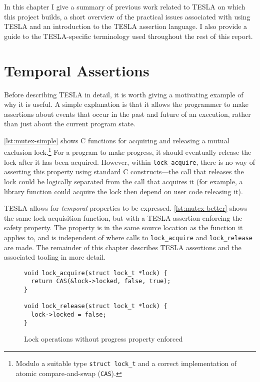 In this chapter I give a summary of previous work related to TESLA on which this
project builds, a short overview of the practical issues associated with using
TESLA and an introduction to the TESLA assertion language. I also provide a
guide to the TESLA-specific terminology used throughout the rest of this report.

\section{Temporal Assertions}

Before describing TESLA in detail, it is worth giving a motivating
example of why it is useful. A simple explanation is that it allows the
programmer to make assertions about events that occur in the past and
future of an execution, rather than just about the current program
state.

\autoref{lst:mutex-simple} shows C functions for acquiring and releasing
a mutual exclusion lock.\footnote{Modulo a suitable type
\texttt{struct lock_t} and a correct implementation of atomic
compare-and-swap (\texttt{CAS}).} For a program to make progress,
it should eventually release the lock after it has been acquired.
However, within \texttt{lock_acquire}, there is no way of
asserting this property using standard C constructs---the call that
releases the lock could be logically separated from the call that
acquires it (for example, a library function could acquire the lock then
depend on user code releasing it).

TESLA allows for \emph{temporal} properties to be expressed.
\autoref{lst:mutex-better} shows the same lock acquisition function, but with a
TESLA assertion enforcing the safety property. The property is in the same
source location as the function it applies to, and is independent of where calls
to \texttt{lock_acquire} and \texttt{lock_release} are made. The
remainder of this chapter describes TESLA assertions and the associated tooling
in more detail.

\begin{figure}
  \begin{verbatim}
void lock_acquire(struct lock_t *lock) {
  return CAS(&lock->locked, false, true);
}

void lock_release(struct lock_t *lock) {
  lock->locked = false;
}
  \end{verbatim}
  \caption{Lock operations without progress property enforced}
  \label{lst:mutex-simple}
\end{figure}

